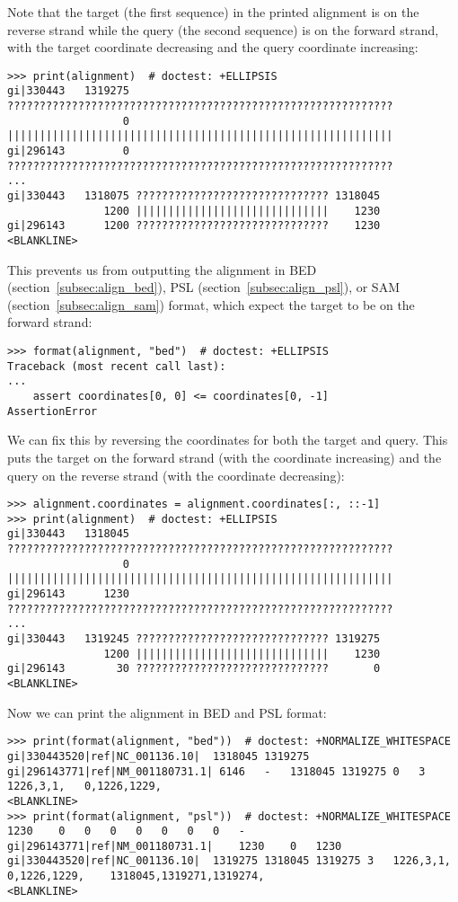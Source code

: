 Note that the target (the first sequence) in the printed alignment is on the reverse strand while the query (the second sequence) is on the forward strand, with the target coordinate decreasing and the query coordinate increasing:
\begin{verbatim}
>>> print(alignment)  # doctest: +ELLIPSIS
gi|330443   1319275 ????????????????????????????????????????????????????????????
                  0 ||||||||||||||||||||||||||||||||||||||||||||||||||||||||||||
gi|296143         0 ????????????????????????????????????????????????????????????
...
gi|330443   1318075 ?????????????????????????????? 1318045
               1200 ||||||||||||||||||||||||||||||    1230
gi|296143      1200 ??????????????????????????????    1230
<BLANKLINE>
\end{verbatim}
This prevents us from outputting the alignment in BED (section~\ref{subsec:align_bed}), PSL (section~\ref{subsec:align_psl}), or SAM (section~\ref{subsec:align_sam}) format, which expect the target to be on the forward strand:
\begin{verbatim}
>>> format(alignment, "bed")  # doctest: +ELLIPSIS
Traceback (most recent call last):
...
    assert coordinates[0, 0] <= coordinates[0, -1]
AssertionError
\end{verbatim}
We can fix this by reversing the coordinates for both the target and query.
This puts the target on the forward strand (with the coordinate increasing) and the query on the reverse strand (with the coordinate decreasing):
\begin{verbatim}
>>> alignment.coordinates = alignment.coordinates[:, ::-1]
>>> print(alignment)  # doctest: +ELLIPSIS
gi|330443   1318045 ????????????????????????????????????????????????????????????
                  0 ||||||||||||||||||||||||||||||||||||||||||||||||||||||||||||
gi|296143      1230 ????????????????????????????????????????????????????????????
...
gi|330443   1319245 ?????????????????????????????? 1319275
               1200 ||||||||||||||||||||||||||||||    1230
gi|296143        30 ??????????????????????????????       0
<BLANKLINE>
\end{verbatim}
Now we can print the alignment in BED and PSL format:
\begin{verbatim}
>>> print(format(alignment, "bed"))  # doctest: +NORMALIZE_WHITESPACE
gi|330443520|ref|NC_001136.10|	1318045	1319275	gi|296143771|ref|NM_001180731.1| 6146	-	1318045	1319275	0	3	1226,3,1,	0,1226,1229,
<BLANKLINE>
>>> print(format(alignment, "psl"))  # doctest: +NORMALIZE_WHITESPACE
1230	0	0	0	0	0	0	0	-	gi|296143771|ref|NM_001180731.1|	1230	0	1230	gi|330443520|ref|NC_001136.10|	1319275	1318045	1319275	3	1226,3,1,	0,1226,1229,	1318045,1319271,1319274,
<BLANKLINE>
\end{verbatim}
